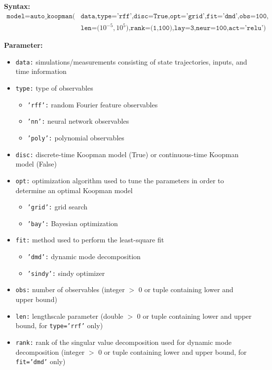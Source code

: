 \documentclass{article}
\begin{document}
	
\noindent \textbf{Syntax:}	
\begin{equation*}
	\begin{split}
	\texttt{model} = \texttt{auto\_koopman(}&\texttt{data,type='rff',disc=True,opt='grid',fit='dmd',obs=100,} \\
	& \texttt{len=(}10^{-5},10^5\texttt{),rank=(1,100),lay=3,neur=100,act='relu')}
	\end{split}
\end{equation*}
	
\noindent \textbf{Parameter:}

\begin{itemize}
	\item \texttt{data:} simulations/measurements consisting of state trajectories, inputs, and time information
	\item \texttt{type:} type of observables
		\begin{itemize}
			\item \texttt{'rff':} random Fourier feature observables
			\item \texttt{'nn':} neural network observables
			\item \texttt{'poly':} polynomial observables
		\end{itemize} 
	\item \texttt{disc:} discrete-time Koopman model (True) or continuous-time Koopman model (False)
	\item \texttt{opt:} optimization algorithm used to tune the parameters in order to determine an optimal Koopman model
		\begin{itemize}
			\item \texttt{'grid':} grid search
			\item \texttt{'bay':} Bayesian optimization
		\end{itemize}
	\item \texttt{fit:} method used to perform the least-square fit
		\begin{itemize}
			\item \texttt{'dmd':} dynamic mode decomposition
			\item \texttt{'sindy':} sindy optimizer
		\end{itemize}
	\item \texttt{obs:} number of observables (integer $>$ 0 or tuple containing lower and upper bound)
	\item \texttt{len:} lengthscale parameter (double $>$ 0 or tuple containing lower and upper bound, for \texttt{type='rrf'} only)
	\item \texttt{rank:} rank of the singular value decomposition used for dynamic mode decomposition (integer $>$ 0 or tuple containing lower and upper bound, for \texttt{fit='dmd'} only)

\end{itemize}
\end{document}
